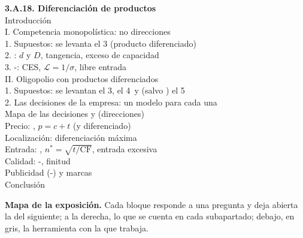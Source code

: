 \documentclass[11pt]{article}
\begin{document}
\begin{esquema}
\textbf{3.A.18. Diferenciación de productos}\\[2pt]
Introducción\\
I. Competencia monopolística: no direcciones\\
\hspace*{1.5em}1. Supuestos: se levanta el 3 (producto diferenciado)\\
\hspace*{1.5em}2. : $d$ y $D$, tangencia, exceso de capacidad\\
\hspace*{1.5em}3. -: CES, $\mathcal{L}=1/\sigma$, libre entrada\\
II. Oligopolio con productos diferenciados\\
\hspace*{1.5em}1. Supuestos: se levantan el 3, el 4~y (salvo ) el 5\\
\hspace*{1.5em}2. Las decisiones de la empresa: un modelo para cada una\\
\hspace*{3em}Mapa de las decisiones y  (direcciones)\\
\hspace*{3em}Precio: , $p=c+t$ (y  diferenciado)\\
\hspace*{3em}Localización: diferenciación máxima\\
\hspace*{3em}Entrada: , $n^*=\sqrt{t/\mathrm{CF}}$, entrada excesiva\\
\hspace*{3em}Calidad: -, finitud\\
\hspace*{3em}Publicidad (-) y marcas\\
Conclusión
\end{esquema}

\begin{anotaciones}
\textbf{Mapa de la exposición.} Cada bloque responde a una pregunta y deja abierta la del siguiente; a la derecha, lo que se cuenta en cada subapartado; debajo, en gris, la herramienta con la que trabaja.
\begin{infografiacaja}
\caption{Mapa del tema: la pregunta de cada bloque, sus subapartados y el hilo que los une}\label{figu:mapa-tema}
\end{infografiacaja}
\end{anotaciones}
\end{document}
